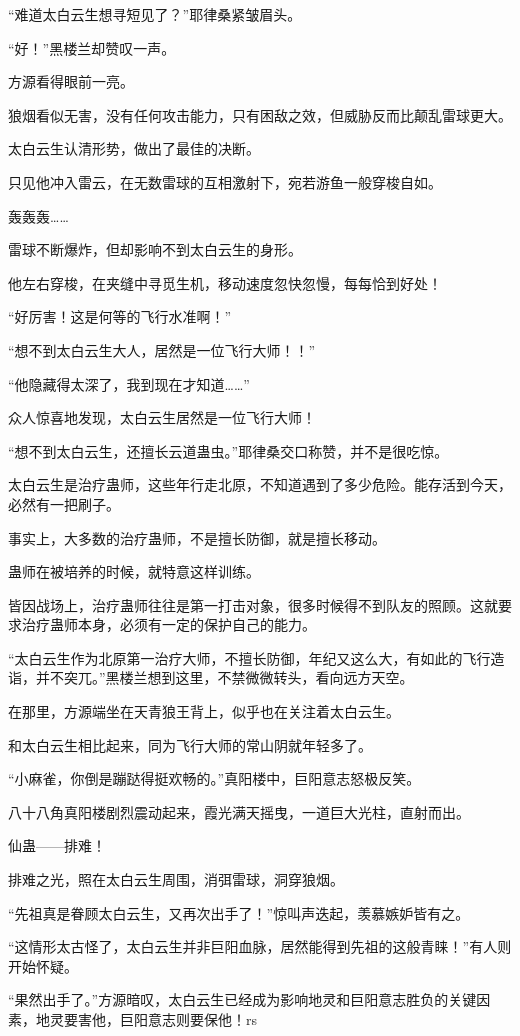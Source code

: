 \begin{this_body}
“难道太白云生想寻短见了？”耶律桑紧皱眉头。

“好！”黑楼兰却赞叹一声。

方源看得眼前一亮。

狼烟看似无害，没有任何攻击能力，只有困敌之效，但威胁反而比颠乱雷球更大。

太白云生认清形势，做出了最佳的决断。

只见他冲入雷云，在无数雷球的互相激射下，宛若游鱼一般穿梭自如。

轰轰轰……

雷球不断爆炸，但却影响不到太白云生的身形。

他左右穿梭，在夹缝中寻觅生机，移动速度忽快忽慢，每每恰到好处！

“好厉害！这是何等的飞行水准啊！”

“想不到太白云生大人，居然是一位飞行大师！！”

“他隐藏得太深了，我到现在才知道……”

众人惊喜地发现，太白云生居然是一位飞行大师！

“想不到太白云生，还擅长云道蛊虫。”耶律桑交口称赞，并不是很吃惊。

太白云生是治疗蛊师，这些年行走北原，不知道遇到了多少危险。能存活到今天，必然有一把刷子。

事实上，大多数的治疗蛊师，不是擅长防御，就是擅长移动。

蛊师在被培养的时候，就特意这样训练。

皆因战场上，治疗蛊师往往是第一打击对象，很多时候得不到队友的照顾。这就要求治疗蛊师本身，必须有一定的保护自己的能力。

“太白云生作为北原第一治疗大师，不擅长防御，年纪又这么大，有如此的飞行造诣，并不突兀。”黑楼兰想到这里，不禁微微转头，看向远方天空。

在那里，方源端坐在天青狼王背上，似乎也在关注着太白云生。

和太白云生相比起来，同为飞行大师的常山阴就年轻多了。

“小麻雀，你倒是蹦跶得挺欢畅的。”真阳楼中，巨阳意志怒极反笑。

八十八角真阳楼剧烈震动起来，霞光满天摇曳，一道巨大光柱，直射而出。

仙蛊——排难！

排难之光，照在太白云生周围，消弭雷球，洞穿狼烟。

“先祖真是眷顾太白云生，又再次出手了！”惊叫声迭起，羡慕嫉妒皆有之。

“这情形太古怪了，太白云生并非巨阳血脉，居然能得到先祖的这般青睐！”有人则开始怀疑。

“果然出手了。”方源暗叹，太白云生已经成为影响地灵和巨阳意志胜负的关键因素，地灵要害他，巨阳意志则要保他！rs

\end{this_body}

